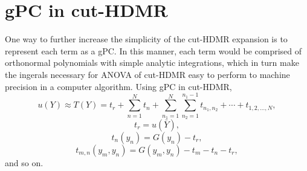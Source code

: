 \documentclass[11pt]{article}
\begin{document}
\section{gPC in cut-HDMR}
One way to further increase the simplicity of the cut-HDMR expansion is to represent each term as a gPC.  In
this manner, each term would be comprised of orthonormal polynomials with simple analytic integrations, which
in turn make the ingerals necessary for ANOVA of cut-HDMR easy to perform to machine precision in a computer
algorithm.  Using gPC in cut-HDMR,
\begin{equation}
  u(Y) \approx T(Y) = t_r + \sum_{n=1}^N t_n + \sum_{n_1=1}^N \sum_{n_2=1}^{n_1-1} t_{n_1,n_2} + \cdots +
  t_{1,2,\ldots,N},
\end{equation}
\begin{equation}
  t_r = u(\bar Y),
\end{equation}
\begin{equation}
  t_n(y_n) = G(y_n) - t_r,
\end{equation}
\begin{equation}
  t_{m,n}(y_m,y_n) = G(y_m,y_n) - t_m - t_n - t_r,
\end{equation}
and so on.
\end{document}
